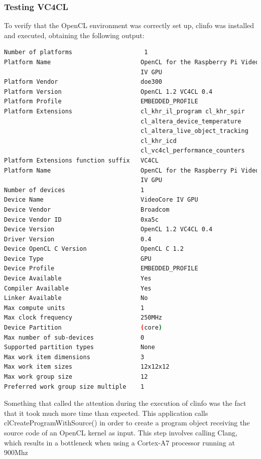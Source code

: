 \documentclass[12pt,a4paper,oneside]{article}
\begin{document}
\subsubsection*{Testing VC4CL}
To verify that the OpenCL environment was correctly set up, clinfo was installed
and executed, obtaining the following output:
\begin{lstlisting}[language=sh,caption={Output of clinfo},captionpos=b,keywords={}]
Number of platforms                    1
Platform Name                         OpenCL for the Raspberry Pi VideoCore
                                      IV GPU
Platform Vendor                       doe300
Platform Version                      OpenCL 1.2 VC4CL 0.4
Platform Profile                      EMBEDDED_PROFILE
Platform Extensions                   cl_khr_il_program cl_khr_spir
                                      cl_altera_device_temperature
                                      cl_altera_live_object_tracking
                                      cl_khr_icd
                                      cl_vc4cl_performance_counters
Platform Extensions function suffix   VC4CL
Platform Name                         OpenCL for the Raspberry Pi VideoCore
                                      IV GPU
Number of devices                     1
Device Name                           VideoCore IV GPU
Device Vendor                         Broadcom
Device Vendor ID                      0xa5c
Device Version                        OpenCL 1.2 VC4CL 0.4
Driver Version                        0.4
Device OpenCL C Version               OpenCL C 1.2
Device Type                           GPU
Device Profile                        EMBEDDED_PROFILE
Device Available                      Yes
Compiler Available                    Yes
Linker Available                      No
Max compute units                     1
Max clock frequency                   250MHz
Device Partition                      (core)
Max number of sub-devices             0
Supported partition types             None
Max work item dimensions              3
Max work item sizes                   12x12x12
Max work group size                   12
Preferred work group size multiple    1
\end{lstlisting}
Something that called the attention during the execution of clinfo was the fact
that it took much more time than expected. This application calls
clCreateProgramWithSource() in order to create a program object receiving the
source code of an OpenCL kernel as input. This step involves calling Clang, which
results in a bottleneck when using a Cortex-A7 processor running at 900Mhz
\end{document}
